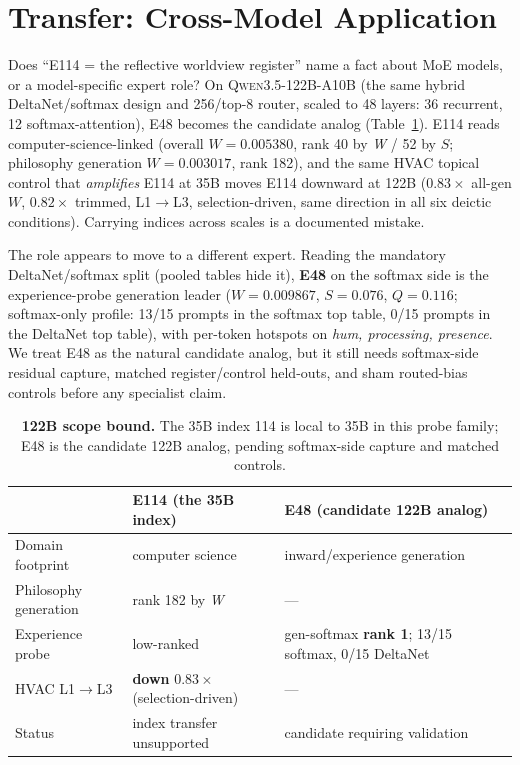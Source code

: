 \documentclass[10pt,a4paper,twocolumn]{article}
\newcommand{\W}{\textit{W}}
\newcommand{\Sel}{\textit{S}}
\newcommand{\Q}{\textit{Q}}
\begin{document}
\section{Transfer: Cross-Model Application}\label{sec:transfer}

Does ``E114 = the reflective worldview register'' name a fact about MoE models, or a
model-specific expert role? On \textsc{Qwen3.5-122B-A10B} (the same hybrid
DeltaNet/softmax design and 256/top-8 router, scaled to 48 layers: 36 recurrent,
12 softmax-attention), E48 becomes the candidate analog (Table~\ref{tab:transfer}). E114 reads
computer-science-linked (overall $\W{=}0.005380$, rank 40 by \W{} / 52 by $\Sel$;
philosophy generation $\W{=}0.003017$, rank 182), and the same HVAC topical
control that \emph{amplifies} E114 at 35B moves E114 downward at 122B
($0.83\times$ all-gen $\W$, $0.82\times$ trimmed, L1$\to$L3, selection-driven,
same direction in all six deictic conditions). Carrying indices across scales is a
documented mistake.

The role appears to move to a different expert. Reading the mandatory
DeltaNet/softmax split (pooled tables hide it), \textbf{E48} on the softmax side
is the experience-probe generation leader ($\W{=}0.009867$, $\Sel{=}0.076$,
$\Q{=}0.116$; softmax-only profile: 13/15 prompts in the softmax top table,
0/15 prompts in the DeltaNet top table), with per-token hotspots on \textit{hum, processing,
presence}. We treat E48 as the natural candidate analog, but it still needs
softmax-side residual capture, matched register/control held-outs, and sham
routed-bias controls before any specialist claim.

\begin{table}[t]
\small
\centering
\begin{tabularx}{0.96\textwidth}{l X X}
\toprule
 & \textbf{E114 (the 35B index)} & \textbf{E48 (candidate 122B analog)} \\
\midrule
Domain footprint        & computer science                  & inward/experience generation \\
Philosophy generation   & rank 182 by \W{}                  & --- \\
Experience probe        & low-ranked                        & gen-softmax \textbf{rank 1}; 13/15 softmax, 0/15 DeltaNet \\
HVAC L1$\rightarrow$L3   & \textbf{down} $0.83\times$ (selection-driven) & --- \\
Status                  & index transfer unsupported         & candidate requiring validation \\
\bottomrule
\end{tabularx}
\caption{\textbf{122B scope bound.} The 35B index 114 is local to 35B in this
probe family; E48 is the candidate 122B analog, pending softmax-side capture and
matched controls.}
\label{tab:transfer}
\end{table}
\end{document}
